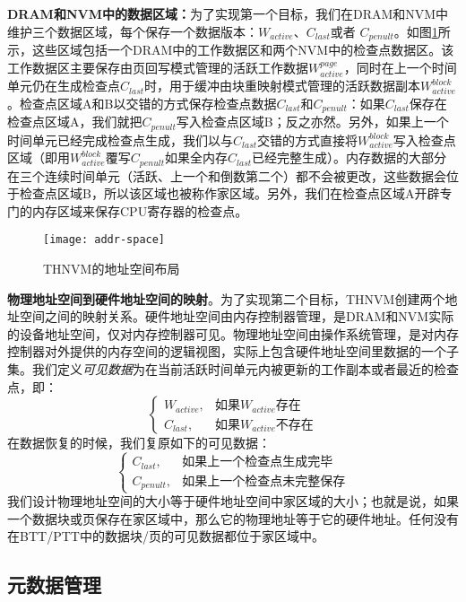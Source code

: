 \textbf{DRAM和NVM中的数据区域：}为了实现第一个目标，我们在DRAM和NVM中维护三个数据区域，每个保存一个数据版本：$W_{active}$、$C_{last}$或者 $C_{penult}$。如图\ref{fig-addr-space}所示，这些区域包括一个DRAM中的工作数据区和两个NVM中的检查点数据区。该工作数据区主要保存由页回写模式管理的活跃工作数据$W^{page}_{active}$，同时在上一个时间单元仍在生成检查点$C_{last}$时，用于缓冲由块重映射模式管理的活跃数据副本$W^{block}_{active}$。检查点区域A和B以交错的方式保存检查点数据$C_{last}$和$C_{penult}$：如果$C_{last}$保存在检查点区域A，我们就把$C_{penult}$写入检查点区域B；反之亦然。另外，如果上一个时间单元已经完成检查点生成，我们以与$C_{last}$交错的方式直接将$W^{block}_{active}$写入检查点区域（即用$W^{block}_{active}$覆写$C_{penult}$如果全内存$C_{last}$已经完整生成）。内存数据的大部分在三个连续时间单元（活跃、上一个和倒数第二个）都不会被更改，这些数据会位于检查点区域B，所以该区域也被称作家区域。另外，我们在检查点区域A开辟专门的内存区域来保存CPU寄存器的检查点。 

\begin{figure}[!ht]
\centering
\texttt{[image: addr-space]}
\caption{THNVM的地址空间布局}
\label{fig-addr-space}
\end{figure}

\textbf{物理地址空间到硬件地址空间的映射}。为了实现第二个目标，THNVM创建两个地址空间之间的映射关系。硬件地址空间由内存控制器管理，是DRAM和NVM实际的设备地址空间，仅对内存控制器可见。物理地址空间由操作系统管理，是对内存控制器对外提供的内存空间的逻辑视图，实际上包含硬件地址空间里数据的一个子集。我们定义\emph{可见数据}为在当前活跃时间单元内被更新的工作副本或者最近的检查点，即： 
\[
\begin{cases}
        W_{active}, & \text{如果}W_{active}\text{存在}\\
        C_{last}, & \text{如果}W_{active}\text{不存在}
\end{cases}
\]
在数据恢复的时候，我们复原如下的可见数据： 
\[
\begin{cases}
        C_{last}, & \text{如果上一个检查点生成完毕}\\
        C_{penult}, & \text{如果上一个检查点未完整保存}
\end{cases}
\]
我们设计物理地址空间的大小等于硬件地址空间中家区域的大小；也就是说，如果一个数据块或页保存在家区域中，那么它的物理地址等于它的硬件地址。任何没有在BTT/PTT中的数据块/页的可见数据都位于家区域中。

\subsection{元数据管理}


